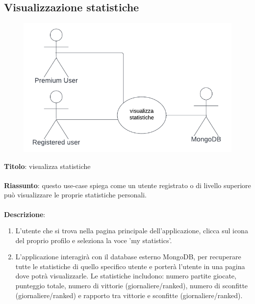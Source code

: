 \subsection{Visualizzazione statistiche} \label{req_visualizzazione_statistiche}
\begin{figure}[!h]
\centering
\includegraphics[scale=0.35]{images/use_case_visualizza_statistiche.png}
\end{figure}
\noindent
\textbf{Titolo}: visualizza statistiche \\
\\
\textbf{Riassunto}: questo use-case spiega come un utente registrato o di livello superiore può visualizzare le proprie statistiche personali. \\
\\
\textbf{Descrizione}:
\begin{enumerate}
    \item L'utente che si trova nella pagina principale dell'applicazione, clicca sul icona del proprio profilo e seleziona la voce 'my statistics'.
    \item L'applicazione interagirà con il database esterno MongoDB, per recuperare tutte le statistiche di quello specifico utente e porterà l'utente in una pagina dove potrà visualizzarle. Le statistiche includono: numero partite giocate, punteggio totale, numero di vittorie (giornaliere/ranked), numero di sconfitte (giornaliere/ranked) e rapporto tra vittorie e sconfitte (giornaliere/ranked).
\end{enumerate}

